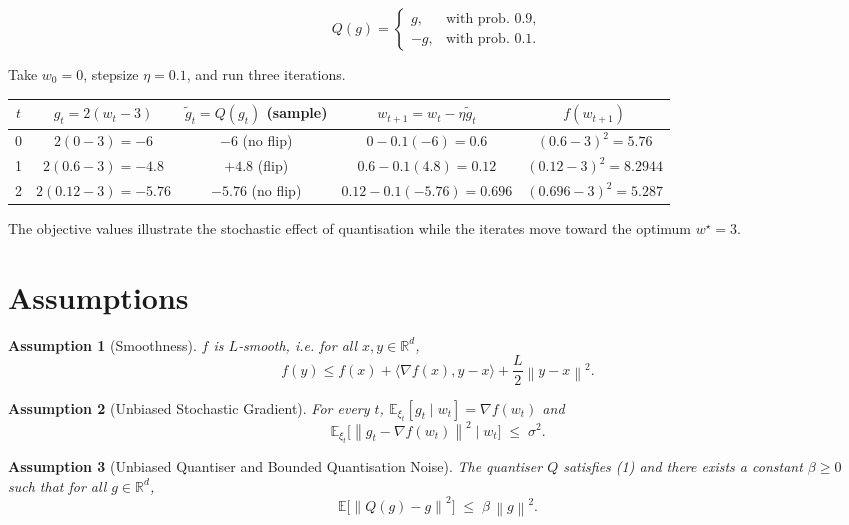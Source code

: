 \documentclass[11pt]{article}
\newtheorem{assumption}{Assumption}
\newcommand{\EE}{\mathbb{E}}
\newcommand{\RR}{\mathbb{R}}
\newcommand{\norm}[1]{\left\lVert#1\right\rVert}
\newcommand{\inner}[2]{\langle #1,#2\rangle}
\begin{document}
\[
Q(g)=\begin{cases}
 g , &\text{with prob. }0.9,\\
 -g , &\text{with prob. }0.1 .
\end{cases}
\]

Take $w_0=0$, stepsize $\eta=0.1$, and run three iterations.

\begin{center}
\begin{tabular}{c|c|c|c|c}
$t$ & $g_t=2(w_t-3)$ & $\tilde g_t=Q(g_t)$ (sample) & $w_{t+1}=w_t-\eta\tilde g_t$ & $f(w_{t+1})$\\ \hline
0 & $2(0-3)=-6$ & $-6$ (no flip) & $0-0.1(-6)=0.6$ & $(0.6-3)^2=5.76$\\
1 & $2(0.6-3)=-4.8$ & $+4.8$ (flip) & $0.6-0.1(4.8)=0.12$ & $(0.12-3)^2=8.2944$\\
2 & $2(0.12-3)=-5.76$ & $-5.76$ (no flip) & $0.12-0.1(-5.76)=0.696$ & $(0.696-3)^2=5.287$\\
\end{tabular}
\end{center}

The objective values illustrate the stochastic effect of quantisation while the iterates move toward the optimum $w^\star=3$.

\newpage
\section*{Assumptions}

\begin{assumption}[Smoothness]\label{asm:smooth}
$f$ is $L$‑smooth, i.e. for all $x,y\in\RR^{d}$,
\[
f(y)\le f(x)+\inner{\nabla f(x)}{y-x}+\frac{L}{2}\norm{y-x}^2 .
\tag{A1}
\]
\end{assumption}

\begin{assumption}[Unbiased Stochastic Gradient]\label{asm:unbiased-grad}
For every $t$, $\EE_{\xi_t}[g_t\mid w_t]=\nabla f(w_t)$ and
\[
\EE_{\xi_t}\!\big[\norm{g_t-\nabla f(w_t)}^2\mid w_t\big]\;\le\;\sigma^2 .
\tag{A2}
\]
\end{assumption}

\begin{assumption}[Unbiased Quantiser and Bounded Quantisation Noise]\label{asm:quant}
The quantiser $Q$ satisfies (1) and there exists a constant $\beta\ge 0$ such that for all $g\in\RR^{d}$,
\[
\EE\!\big[\norm{Q(g)-g}^2\big]\;\le\;\beta\,\norm{g}^2 .
\tag{A3}
\]
\end{assumption}
\end{document}
